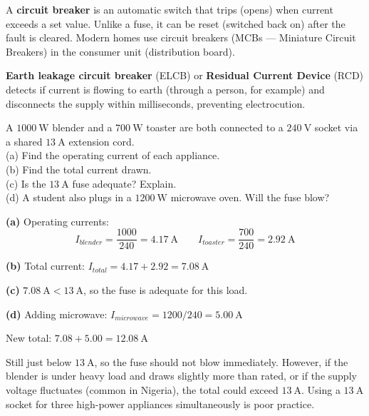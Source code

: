 \begin{defbox}
A \textbf{circuit breaker} is an automatic switch
that trips (opens) when current exceeds a set value.
Unlike a fuse, it can be reset (switched back on)
after the fault is cleared. Modern homes use circuit
breakers (MCBs --- Miniature Circuit Breakers) in
the consumer unit (distribution board).

\textbf{Earth leakage circuit breaker} (ELCB) or
\textbf{Residual Current Device} (RCD) detects if
current is flowing to earth (through a person, for
example) and disconnects the supply within
milliseconds, preventing electrocution.
\end{defbox}

\begin{examplebox}[24.3]
A $1000\ \text{W}$ blender and a $700\ \text{W}$
toaster are both connected to a $240\ \text{V}$
socket via a shared $13\ \text{A}$ extension cord.\\
(a) Find the operating current of each appliance.\\
(b) Find the total current drawn.\\
(c) Is the $13\ \text{A}$ fuse adequate? Explain.\\
(d) A student also plugs in a $1200\ \text{W}$
microwave oven. Will the fuse blow?
\end{examplebox}

\begin{solutionbox}
\textbf{(a)} Operating currents:
\[
  I_{blender} = \frac{1000}{240} = 4.17\ \text{A}
  \qquad
  I_{toaster} = \frac{700}{240} = 2.92\ \text{A}
\]

\textbf{(b)} Total current:
$I_{total} = 4.17 + 2.92 = 7.08\ \text{A}$

\textbf{(c)} $7.08\ \text{A} < 13\ \text{A}$,
so the fuse is adequate for this load.

\textbf{(d)} Adding microwave:
$I_{microwave} = 1200/240 = 5.00\ \text{A}$

New total: $7.08 + 5.00 = 12.08\ \text{A}$

Still just below $13\ \text{A}$, so the fuse should
not blow immediately. However, if the blender is
under heavy load and draws slightly more than rated,
or if the supply voltage fluctuates (common in
Nigeria), the total could exceed $13\ \text{A}$.
Using a $13\ \text{A}$ socket for three high-power
appliances simultaneously is poor practice.
\end{solutionbox}


